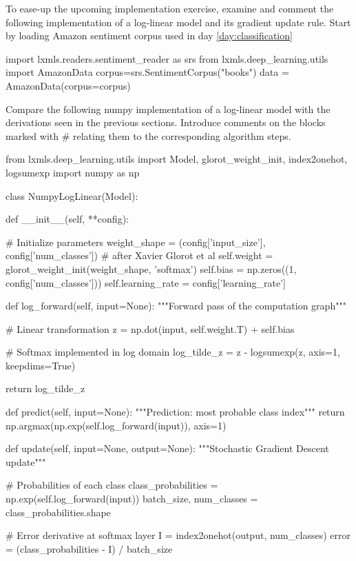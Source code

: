 \begin{exercise}
\label{exercise:exerciseNumpy1}
To ease-up the upcoming implementation exercise, examine and comment the following implementation of a log-linear model and its gradient update rule.
Start by loading Amazon sentiment corpus used in day \ref{day:classification}
\begin{python}
import lxmls.readers.sentiment_reader as srs
from lxmls.deep_learning.utils import AmazonData
corpus=srs.SentimentCorpus("books")
data = AmazonData(corpus=corpus)
\end{python}
Compare the following numpy implementation of a log-linear model with the derivations seen in the previous sections. Introduce comments on the blocks marked with \# relating them to the corresponding algorithm steps.
\begin{python}
from lxmls.deep_learning.utils import Model, glorot_weight_init, index2onehot, logsumexp
import numpy as np

class NumpyLogLinear(Model):

    def __init__(self, **config):

        # Initialize parameters
        weight_shape = (config['input_size'], config['num_classes'])
        # after Xavier Glorot et al
        self.weight = glorot_weight_init(weight_shape, 'softmax')
        self.bias = np.zeros((1, config['num_classes']))
        self.learning_rate = config['learning_rate']

    def log_forward(self, input=None):
        """Forward pass of the computation graph"""

        # Linear transformation
        z = np.dot(input, self.weight.T) + self.bias

        # Softmax implemented in log domain
        log_tilde_z = z - logsumexp(z, axis=1, keepdims=True)

        return log_tilde_z

    def predict(self, input=None):
        """Prediction: most probable class index"""
        return np.argmax(np.exp(self.log_forward(input)), axis=1)

    def update(self, input=None, output=None):
        """Stochastic Gradient Descent update"""

        # Probabilities of each class
        class_probabilities = np.exp(self.log_forward(input))
        batch_size, num_classes = class_probabilities.shape

        # Error derivative at softmax layer
        I = index2onehot(output, num_classes)
        error = (class_probabilities - I) / batch_size


\end{python}
\end{exercise}
